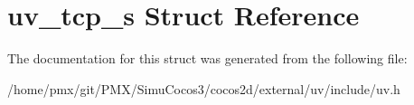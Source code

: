 \hypertarget{structuv__tcp__s}{}\section{uv\+\_\+tcp\+\_\+s Struct Reference}
\label{structuv__tcp__s}


The documentation for this struct was generated from the following file\+:\begin{DoxyCompactItemize}
\item 
/home/pmx/git/\+P\+M\+X/\+Simu\+Cocos3/cocos2d/external/uv/include/uv.\+h\end{DoxyCompactItemize}

